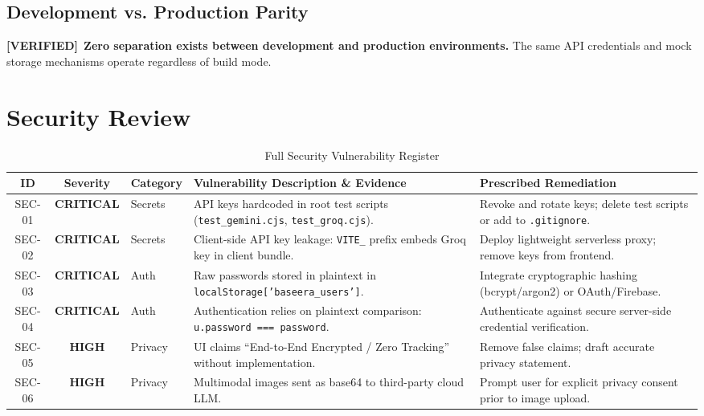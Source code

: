 \documentclass[10pt,a4paper]{report}
\newcommand{\verified}{\colorbox{green!15}{\textcolor{passGreen}{\bfseries\scriptsize [VERIFIED]}}}
\newcommand{\badgeCrit}{\colorbox{red!20}{\textcolor{critRed}{\bfseries\scriptsize CRITICAL}}}
\newcommand{\badgeHigh}{\colorbox{orange!20}{\textcolor{critRed!80!orange}{\bfseries\scriptsize HIGH}}}
\begin{document}
\section{Development vs. Production Parity}
\verified\ \textbf{Zero separation exists between development and production environments.} The same API credentials and mock storage mechanisms operate regardless of build mode.

\chapter{Security Review}

\begin{table}[htbp]
\centering
\scriptsize
\caption{Full Security Vulnerability Register}
\begin{tabularx}{\textwidth}{c c l X p{3.5cm}}
\toprule
\textbf{ID} & \textbf{Severity} & \textbf{Category} & \textbf{Vulnerability Description \& Evidence} & \textbf{Prescribed Remediation} \\
\midrule
SEC-01 & \badgeCrit & Secrets & API keys hardcoded in root test scripts (\texttt{test\_gemini.cjs}, \texttt{test\_groq.cjs}). & Revoke and rotate keys; delete test scripts or add to \texttt{.gitignore}. \\
\addlinespace
SEC-02 & \badgeCrit & Secrets & Client-side API key leakage: \texttt{VITE\_} prefix embeds Groq key in client bundle. & Deploy lightweight serverless proxy; remove keys from frontend. \\
\addlinespace
SEC-03 & \badgeCrit & Auth & Raw passwords stored in plaintext in \texttt{localStorage['baseera\_users']}. & Integrate cryptographic hashing (bcrypt/argon2) or OAuth/Firebase. \\
\addlinespace
SEC-04 & \badgeCrit & Auth & Authentication relies on plaintext comparison: \texttt{u.password === password}. & Authenticate against secure server-side credential verification. \\
\addlinespace
SEC-05 & \badgeHigh & Privacy & UI claims ``End-to-End Encrypted / Zero Tracking'' without implementation. & Remove false claims; draft accurate privacy statement. \\
\addlinespace
SEC-06 & \badgeHigh & Privacy & Multimodal images sent as base64 to third-party cloud LLM. & Prompt user for explicit privacy consent prior to image upload. \\

\end{tabularx}
\end{table}
\end{document}

